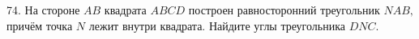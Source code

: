 74. На стороне $AB$ квадрата $ABCD$ построен равносторонний треугольник $NAB,$ причём точка $N$ лежит внутри квадрата. Найдите углы треугольника $DNC.$\\
